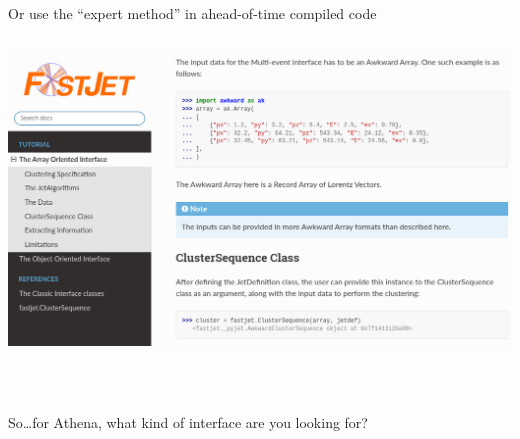 \documentclass[aspectratio=169]{beamer}
\begin{document}
\begin{frame}{Or use the ``expert method'' in ahead-of-time compiled code}
\vspace{0.18 cm}
\begin{columns}
\includegraphics[width=\linewidth]{fastjet-documentation.png}
\end{columns}
\end{frame}

\begin{frame}{\mbox{ }}
\Large
\vspace{0.5 cm}
\begin{center}
So\ldots for Athena, what kind of interface are you looking for?
\end{center}
\end{frame}
\end{document}
